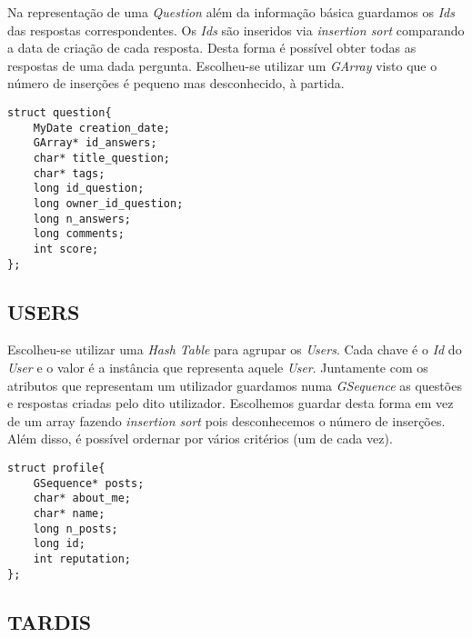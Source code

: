 \documentclass[letterpaper, 10 pt, conference]{IEEEtran}  %
\begin{document}
Na representação de uma \textit{Question} além da informação básica guardamos os \textit{Ids} das respostas correspondentes. Os \textit{Ids} são inseridos via \textit{insertion sort} comparando a data de criação de cada resposta. Desta forma é possível obter todas as respostas de uma dada pergunta.
Escolheu-se utilizar um \textit{GArray} visto que o número de inserções é pequeno mas desconhecido, à partida.

\begin{lstlisting}
struct question{
    MyDate creation_date;
    GArray* id_answers;
    char* title_question;
    char* tags;
    long id_question;
    long owner_id_question;
    long n_answers;
    long comments;
    int score;
};
\end{lstlisting}

\subsection{USERS}

Escolheu-se utilizar uma \textit{Hash Table} para agrupar os \textit{Users}. Cada chave é o \textit{Id} do \textit{User} e o valor é a instância que representa aquele \textit{User}.
Juntamente com os atributos que representam um utilizador guardamos numa \textit{GSequence} as questões e respostas criadas pelo dito utilizador. Escolhemos guardar desta forma em vez de um array fazendo \textit{insertion sort} pois desconhecemos o número de inserções. Além disso, é possível ordernar por vários critérios (um de cada vez).

\begin{lstlisting}
struct profile{
    GSequence* posts;
    char* about_me;
    char* name;
    long n_posts;
    long id;
    int reputation;
};
\end{lstlisting}


\subsection{TARDIS}
\end{document}
